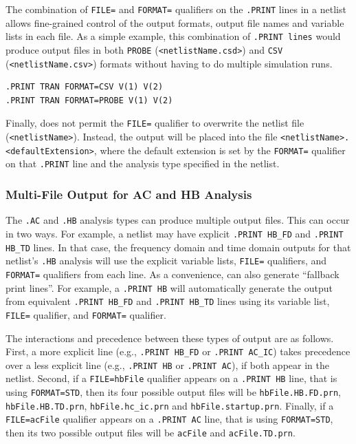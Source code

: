 The combination of \texttt{FILE=} and \texttt{FORMAT=} qualifiers on the 
\texttt{.PRINT} lines in a netlist allows fine-grained control of the 
output formats, output file names and variable lists in each file.  As a 
simple example, this combination of \texttt{.PRINT lines} would produce output
files in both \texttt{PROBE} (\verb+<netlistName.csd>+) and \texttt{CSV}
(\verb+<netlistName.csv>+) formats without having to do multiple simulation runs.

\begin{verbatim}
.PRINT TRAN FORMAT=CSV V(1) V(2)
.PRINT TRAN FORMAT=PROBE V(1) V(2) 
\end{verbatim}

Finally, \Xyce{} does not permit the \texttt{FILE=} qualifier to overwrite the 
netlist file (\verb+<netlistName>+).  Instead, the output will be placed into 
the file \verb+<netlistName>.<defaultExtension>+, where the default extension
is set by  the \texttt{FORMAT=} qualifier on that \texttt{.PRINT} line and the 
analysis type specified in the netlist.

\subsubsection{Multi-File Output for AC and HB Analysis}
The {\tt .AC} and {\tt .HB} analysis types can produce multiple output files.
This can occur in two ways.  For example, a netlist may have explicit
\texttt{.PRINT HB\_FD} and \texttt{.PRINT HB\_TD} lines.  In that case, the
frequency domain and time domain outputs for that netlist's {\tt .HB} analysis 
will use the explicit variable lists, \texttt{FILE=} qualifiers, and \texttt{FORMAT=} 
qualifiers from each line.  As a convenience, \Xyce{} can also generate
``fallback print lines''.  For example, a \texttt{.PRINT HB} will 
automatically generate the output from equivalent \texttt{.PRINT HB\_FD} 
and \texttt{.PRINT HB\_TD} lines using its variable list, \texttt{FILE=} qualifier, 
and \texttt{FORMAT=} qualifier.  

The interactions and precedence between these types of output are as follows.  
First, a more explicit line (e.g., \texttt{.PRINT HB\_FD} or 
\texttt{.PRINT AC\_IC}) takes precedence over a less explicit line (e.g., 
\texttt{.PRINT HB} or \texttt{.PRINT AC}), if both appear in the netlist.
Second, if a \texttt{FILE=hbFile} qualifier appears on a \texttt{.PRINT HB}
line, that is using \texttt{FORMAT=STD}, then its four possible output files 
will be \texttt{hbFile.HB.FD.prn}, \texttt{hbFile.HB.TD.prn},
\texttt{hbFile.hc\_ic.prn} and \texttt{hbFile.startup.prn}.  Finally, if a
\texttt{FILE=acFile} qualifier appears on a \texttt{.PRINT AC} line, that 
is using \texttt{FORMAT=STD}, then its two possible output files will 
be \texttt{acFile} and \texttt{acFile.TD.prn}.    
  
